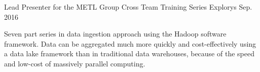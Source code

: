 \begin{cventries}
  \cventry
    {Lead Presenter for the METL Group} %
    {Cross Team Training Series} %
    {Explorys} %
    {Sep. 2016} %
    {
      \begin{cvitems} %
        \item {Seven part series in data ingestion approach using the Hadoop software framework.  Data can be aggregated much more quickly and cost-effectively using a data lake framework than in traditional data warehouses, because of the speed and low-cost of massively parallel computing.}
      \end{cvitems}
    }

\end{cventries}
